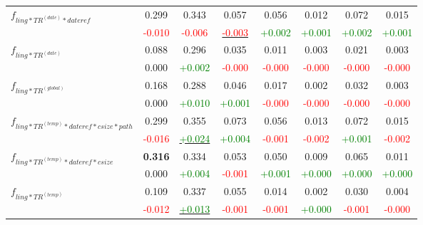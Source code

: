 \documentclass[a4paper,BCOR=10mm]{report}
\numberwithin{lemma}{chapter}
\numberwithin{definition}{chapter}
\begin{document}
\begin{table}
\begin{centering}
{\begin{tabular}{|l|ccccccc|}
\multirow{2}{*}{$f_{ ling*TR^{(date)}*\mathit{dateref} }$}    & 0.299 & 0.343 & 0.057 & 0.056 & 0.012 & 0.072 & 0.015 \\
    & \small \textcolor{red}{-0.010}    & \small \textcolor{red}{-0.006}    & \underline{\small \textcolor{red}{-0.003}}    & \small \textcolor{green}{+0.002}  & \small \textcolor{green}{+0.001}  & \small \textcolor{green}{+0.002}  & \small \textcolor{green}{+0.001} \\\hline
\multirow{2}{*}{$f_{ ling*TR^{(date)} }$}   & 0.088 & 0.296 & 0.035 & 0.011 & 0.003 & 0.021 & 0.003 \\
    & 0.000 & \small \textcolor{green}{+0.002}  & \small \textcolor{red}{-0.000}    & \small \textcolor{red}{-0.000}    & \small \textcolor{red}{-0.000}    & \small \textcolor{red}{-0.000}    & \small \textcolor{red}{-0.000} \\\hline
\multirow{2}{*}{$f_{ ling*TR^{(global)} }$} & 0.168 & 0.288 & 0.046 & 0.017 & 0.002 & 0.032 & 0.003 \\
    & 0.000 & \small \textcolor{green}{+0.010}  & \small \textcolor{green}{+0.001}  & \small \textcolor{red}{-0.000}    & \small \textcolor{red}{-0.000}    & \small \textcolor{red}{-0.000}    & \small \textcolor{red}{-0.000} \\\hline
\multirow{2}{*}{$f_{ ling*TR^{(temp)}*\mathit{dateref}*\mathit{csize}*\mathit{path} }$}   & 0.299 & 0.355 & 0.073 & 0.056 & 0.013 & 0.072 & 0.015 \\
    & \small \textcolor{red}{-0.016}    & \underline{\small \textcolor{green}{+0.024}}  & \small \textcolor{green}{+0.004}  & \small \textcolor{red}{-0.001}    & \small \textcolor{red}{-0.002}    & \small \textcolor{green}{+0.001}  & \small \textcolor{red}{-0.002} \\\hline
\multirow{2}{*}{$f_{ ling*TR^{(temp)}*\mathit{dateref}*\mathit{csize} }$}   & \textbf{ 0.316 }  & 0.334 & 0.053 & 0.050 & 0.009 & 0.065 & 0.011 \\
    & 0.000 & \small \textcolor{green}{+0.004}  & \small \textcolor{red}{-0.001}    & \small \textcolor{green}{+0.001}  & \small \textcolor{green}{+0.000}  & \small \textcolor{green}{+0.000}  & \small \textcolor{green}{+0.000} \\\hline
\multirow{2}{*}{$f_{ ling*TR^{(temp)} }$}   & 0.109 & 0.337 & 0.055 & 0.014 & 0.002 & 0.030 & 0.004 \\
    & \small \textcolor{red}{-0.012}    & \underline{\small \textcolor{green}{+0.013}}  & \small \textcolor{red}{-0.001}    & \small \textcolor{red}{-0.001}    & \small \textcolor{green}{+0.000}  & \small \textcolor{red}{-0.001}    & \small \textcolor{red}{-0.000} \\\hline

\end{tabular}}
\end{centering}
\end{table}
\end{document}

